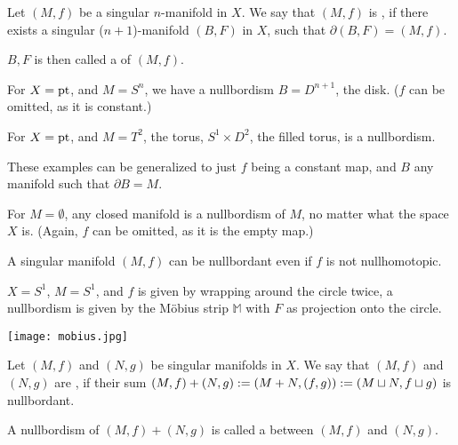 \documentclass[a4paper,11pt]{article}
\begin{document}
\begin{definition}
    Let \((M,f)\) be a singular \(n\)-manifold in \(X\). We say that \((M,f)\) is , if there exists a singular (\(n+1\))-manifold \((B,F)\) in \(X\), such that \(\partial(B,F)=(M,f)\).

    \(B,F\) is then called a  of \((M,f)\).
\end{definition}

\begin{example}
    For \(X=\mathrm{pt}\), and \(M=S^n\), we have a nullbordism \(B=D^{n+1}\), the disk. (\(f\) can be omitted, as it is constant.)
\end{example}

\begin{example}
    For \(X=\mathrm{pt}\), and \(M=T^2\), the torus, \(S^1\times D^2\), the filled torus, is a nullbordism.
\end{example}

These examples can be generalized to just \(f\) being a constant %
 map, and \(B\) any manifold such that \(\partial B=M\). 

\begin{example}
    For \(M=\emptyset\), any closed manifold is a nullbordism of \(M\), no matter what the space \(X\) is. (Again, \(f\) can be omitted, as it is the empty map.)
\end{example}

\begin{observation}
    A singular manifold \((M,f)\) can be nullbordant even if \(f\) is not nullhomotopic.
\end{observation}

\begin{example}
    \(X=S^1\), \(M=S^1\), and \(f\) is given by wrapping around the circle twice, a nullbordism is given by the M\"obius strip \(\mathbb{M}\) with \(F\) as projection onto the circle.\begin{center} \texttt{[image: mobius.jpg]} \end{center}
\end{example}


\begin{definition}\label{bordant}
    Let \((M,f)\) and \((N,g)\) be singular manifolds in \(X\). We say that \((M,f)\) and \((N,g)\) are , if their sum \((M,f)+(N,g):=(M+N, (f,g)):=(M\sqcup N, f\sqcup g)\) is nullbordant.

    A nullbordism of \((M,f)+(N,g)\) is called a  between \((M,f)\) and \((N,g)\).
\end{definition}
\end{document}
